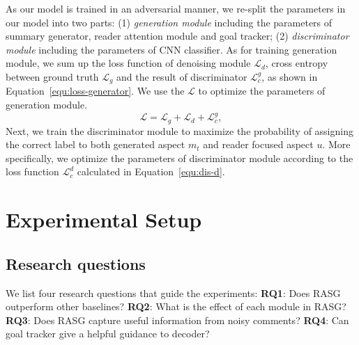 \documentclass[letterpaper]{article} %
\begin{document}
As our model is trained in an adversarial manner, we re-split the parameters in our model into two parts: (1) \textit{generation module} including the parameters of summary generator, reader attention module and goal tracker; (2) \textit{discriminator module} including the parameters of CNN classifier.
As for training generation module, we sum up the loss function of denoising module $\mathcal{L}_d$, cross entropy between ground truth $\mathcal{L}_g$ and the result of discriminator $\mathcal{L}^g_c$, as shown in Equation~\ref{equ:loss-generator}.
We use the $\mathcal{L}$ to optimize the parameters of generation module.
\begin{equation}
    \mathcal{L} = \mathcal{L}_g + \mathcal{L}_d + \mathcal{L}^g_c , \label{equ:loss-generator}
\end{equation}
Next, we train the discriminator module to maximize the probability of assigning the correct label to both generated aspect $m_t$ and reader focused aspect $u$.
More specifically, we optimize the parameters of discriminator module according to the loss function $\mathcal{L}^d_c$ calculated in Equation~\ref{equ:dis-d}.

\section{Experimental Setup}

\subsection{Research questions}

We list four research questions that guide the experiments:
\noindent \textbf{RQ1}: Does RASG outperform other baselines?
\noindent \textbf{RQ2}: What is the effect of each module in RASG?
\noindent \textbf{RQ3}: Does RASG capture useful information from noisy comments?
\noindent \textbf{RQ4}: Can goal tracker give a helpful guidance to decoder?
\end{document}
